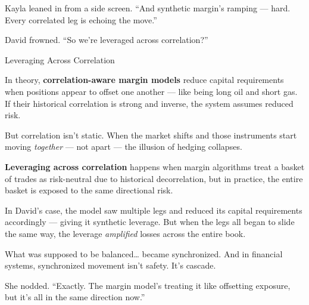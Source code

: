 Kayla leaned in from a side screen. “And synthetic margin’s ramping — hard. Every correlated leg is echoing the move.”

David frowned. “So we’re leveraged across correlation?”

\medskip

\begin{TechnicalSidebar}{Leveraging Across Correlation}

  In theory, \textbf{correlation-aware margin models} reduce capital requirements when positions appear to offset one 
  another — like being long oil and short gas. If their historical correlation is strong and inverse, the system assumes 
  reduced risk.

  \medskip

  But correlation isn’t static.  
  When the market shifts and those instruments start moving \textit{together} — not apart — the illusion of hedging collapses.

  \medskip

  \textbf{Leveraging across correlation} happens when margin algorithms treat a basket of trades as risk-neutral due to 
  historical decorrelation, but in practice, the entire basket is exposed to the same directional risk.

  \medskip

  In David’s case, the model saw multiple legs and reduced its capital requirements accordingly — giving it synthetic 
  leverage. But when the legs all began to slide the same way, the leverage \textit{amplified} losses across the entire book.

  \medskip

  What was supposed to be balanced… became synchronized.  
  And in financial systems, synchronized movement isn’t safety.  
  It’s cascade.

\end{TechnicalSidebar}

\medskip

She nodded. “Exactly. The margin model’s treating it like offsetting exposure, but it’s all in the same direction now.”

\medskip

